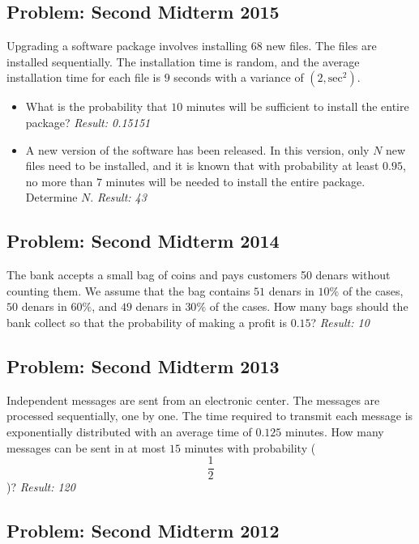 \documentclass[a4paper, 12pt]{article}
\begin{document}
\subsection{Problem: Second Midterm 2015}
Upgrading a software package involves installing $68$ new files. The files are installed sequentially. The installation time is random, and the average installation time for each file is $9$ seconds with a variance of $(2,\text{sec}^2)$.

\begin{itemize}
  \item [a)] What is the probability that $10$ minutes will be sufficient to install the entire package?
\textit{Result: {0.15151}}
\item [b)] A new version of the software has been released. In this version, only $N$ new files need to be installed, and it is known that with probability at least $0.95$, no more than $7$ minutes will be needed to install the entire package. Determine $N$.
\textit{Result: {43}}

\end{itemize}



\subsection{Problem: Second Midterm 2014}
The bank accepts a small bag of coins and pays customers 50 denars without counting them. We assume that the bag contains $51$ denars in $10\%$ of the cases, $50$ denars in $60\%$, and $49$ denars in $30\%$ of the cases. How many bags should the bank collect so that the probability of making a profit is $0.15$?
\textit{Result: {10}}

\subsection{Problem: Second Midterm 2013}

Independent messages are sent from an electronic center. The messages are processed sequentially, one by one. The time required to transmit each message is exponentially distributed with an average time of $0.125$ minutes. How many messages can be sent in at most $15$ minutes with probability ( $$\frac{1}{2} $$)?
\textit{Result: {120}}

\subsection{Problem: Second Midterm 2012}
\end{document}
